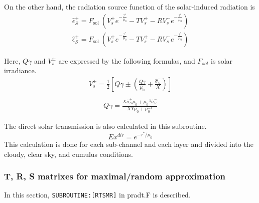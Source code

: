 On the other hand, the radiation source function of the solar-induced
radiation is \begin{equation}
\begin{array}{l}
\hat{\epsilon}_{S}^{+}=F_{\text {sol }}\left(V_{s}^{+} e^{-\frac{\tau^{*}}{\mu_{0}}}-T V_{s}^{+}-R V_{s}^{-} e^{-\frac{\tau^{*}}{\mu_{0}}}\right)
\end{array}
\end{equation} \begin{equation}
\begin{array}{l}
\hat{\epsilon}_{S}^{+}=F_{\text {sol }}\left(V_{s}^{+} e^{-\frac{\tau^{*}}{\mu_{0}}}-T V_{s}^{+}-R V_{s}^{-} e^{-\frac{\tau^{*}}{\mu_{0}}}\right)
\end{array}
\end{equation}

Here, \(Q \gamma\) and \(V_{s}^{\pm}\) are expressed by the following
formulas, and \(F_{sol}\) is solar irradiance. \begin{equation}
\begin{array}{c}
V_{s}^{\pm}=\frac{1}{2}\left[Q \gamma \pm\left(\frac{Q \gamma}{\mu_{0}}+\frac{\hat{\sigma}_{S}^{-}}{X}\right)\right] \\
\end{array}
\end{equation} \begin{equation}
\begin{array}{c}
Q \gamma=\frac{X \hat{\sigma}_{S}^{+} \mu_{0}+\mu_{0}^{-1} \hat{\sigma}_{S}^{-}}{X Y \mu_{0}+\mu_{0}^{-1}}
\end{array}
\end{equation}

The direct solar transmission is also calculated in this subroutine. \begin{equation}
E x^{d i r}=e^{-\tau^{*}/ \mu_{0}}
\end{equation} This calculation is done for each sub-channel and each layer and
divided into the cloudy, clear sky, and cumulus conditions.

\hypertarget{t-r-s-matrixes-for-maximalrandom-approximation}{%
\subsubsection{T, R, S matrixes for maximal/random
approximation}\label{t-r-s-matrixes-for-maximalrandom-approximation}}

In this section, \texttt{SUBROUTINE:{[}RTSMR{]}} in pradt.F is
described.

